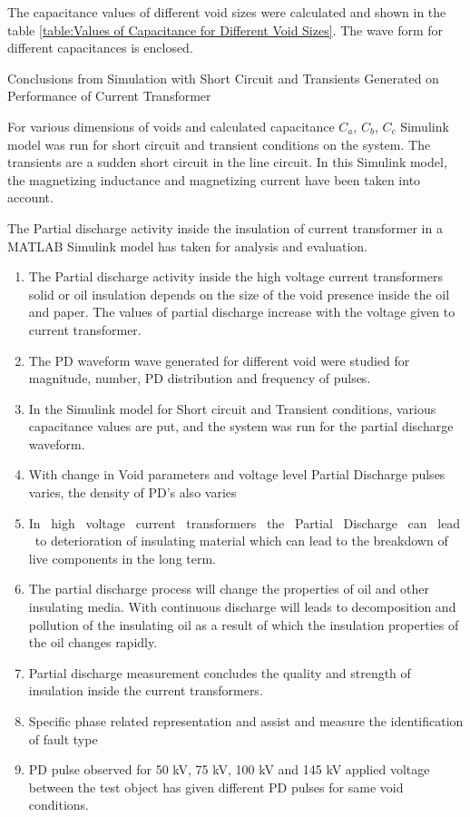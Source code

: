The capacitance values of different void sizes were calculated and shown in the table \ref{table:Values of Capacitance for Different Void Sizes}. The wave form for different capacitances is enclosed.

Conclusions from Simulation with Short Circuit and Transients Generated on Performance of Current Transformer

For various dimensions of voids and calculated capacitance $C_a$, $C_b$, $C_c$ Simulink model was run for short circuit and transient conditions on the system. The transients are a sudden short circuit in the line circuit. In this Simulink model, the magnetizing inductance and magnetizing current have been taken into account.

The Partial discharge activity inside the insulation of current transformer in a MATLAB Simulink model has taken for analysis and evaluation.

\begin{enumerate}
\item The Partial discharge activity inside the high voltage current transformers solid or oil insulation depends on the size of the void presence inside the oil and paper. The values of partial discharge increase with the voltage given to current transformer.

\item The PD waveform wave generated for different void were studied for magnitude, number, PD distribution and frequency of pulses.

\item In the Simulink model for Short circuit and Transient conditions, various capacitance values are put, and the system was run for the partial discharge waveform.

\item With change in Void parameters and voltage level Partial Discharge pulses varies, the density of PD's also varies

\item In ~high ~voltage ~current ~transformers ~the ~Partial ~Discharge ~can ~lead ~to deterioration of insulating material which can lead to the breakdown of live components in the long term.

\item The partial discharge process will change the properties of oil and other insulating media. With continuous discharge will leads to decomposition and pollution of the insulating oil as a result of which the insulation properties of the oil changes rapidly. 

\item Partial discharge measurement concludes the quality and strength of insulation inside the current transformers.

\item Specific phase related representation and assist and measure the identification of fault type 

\item PD pulse observed for 50 kV, 75 kV, 100 kV and 145 kV applied voltage between the test object has given different PD pulses for same void conditions\setlength{\parskip}{0em}.
\end{enumerate}
\pagebreak 

